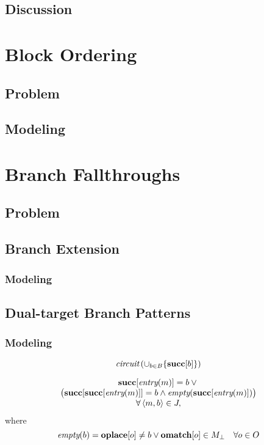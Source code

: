 \subsection{Discussion}

\section{Block Ordering}
\subsection{Problem}
\subsection{Modeling}

\section{Branch Fallthroughs}
\subsection{Problem}
\subsection{Branch Extension}
\subsubsection{Modeling}
\subsection{Dual-target Branch Patterns}
\subsubsection{Modeling}

\begin{equation}
  \mCircuit\left(
    \cup_{b \in \mBlockSet} \{\mVar{succ}[b]\}
  \right)
  \labelEquation{block-order}
\end{equation}

\begin{equation}
  \begin{array}{c}
    \mVar{succ}[\mEntry(m)] = b \mOr \mbox{} \\
    \big(
      \mVar{succ}[\mVar{succ}[\mEntry(m)]] = b
      \mAnd
      \mEmptyBlock(\mVar{succ}[\mEntry(m)])
    \big) \\
    \forall \mTuple{m}{b} \in \mFallThroughSet,
  \end{array}
  \labelEquation{fall-through}
\end{equation}
%
where
%
\begin{equation*}
  \mEmptyBlock(b) =
  \mVar{oplace}[o] \neq b
  \mOr
  \mVar{omatch}[o] \in \mMatchSet[\mNull]
  \mQuantSep
  \forall o \in \mOpSet
\end{equation*}

